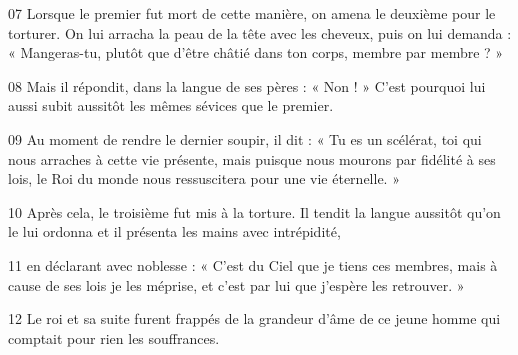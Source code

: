 07 Lorsque le premier fut mort de cette manière, on amena le deuxième pour le torturer. On lui arracha la peau de la tête avec les cheveux, puis on lui demanda : « Mangeras-tu, plutôt que d’être châtié dans ton corps, membre par membre ? »

08 Mais il répondit, dans la langue de ses pères : « Non ! » C’est pourquoi lui aussi subit aussitôt les mêmes sévices que le premier.

09 Au moment de rendre le dernier soupir, il dit : « Tu es un scélérat, toi qui nous arraches à cette vie présente, mais puisque nous mourons par fidélité à ses lois, le Roi du monde nous ressuscitera pour une vie éternelle. »

10 Après cela, le troisième fut mis à la torture. Il tendit la langue aussitôt qu’on le lui ordonna et il présenta les mains avec intrépidité,

11 en déclarant avec noblesse : « C’est du Ciel que je tiens ces membres, mais à cause de ses lois je les méprise, et c’est par lui que j’espère les retrouver. »

12 Le roi et sa suite furent frappés de la grandeur d’âme de ce jeune homme qui comptait pour rien les souffrances.